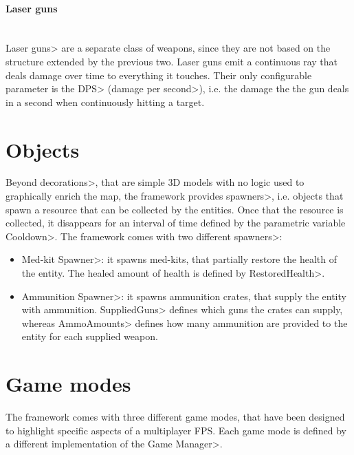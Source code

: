 \paragraph{Laser guns}

\mbox{}\\

{\setlength{\parindent}{0cm}
\<Laser guns> are a separate class of weapons, since they are not based on the structure extended by the previous two. Laser guns emit a continuous ray that deals damage over time to everything it touches. Their only configurable parameter is the \<DPS> (\<damage per second>), i.e. the damage the the gun deals in a second when continuously hitting a target.
}


\section{Objects}

Beyond \<decorations>, that are simple 3D models with no logic used to graphically enrich the map, the framework provides \<spawners>, i.e. objects that spawn a resource that can be collected by the entities. Once that the resource is collected, it disappears for an interval  of time defined by the parametric variable  \<Cooldown>. The framework comes with two different \<spawners>:

\begin{itemize}
\item \<Med-kit Spawner>: it spawns med-kits, that partially restore the health of the entity. The healed amount of health is defined by \<RestoredHealth>.
\item \<Ammunition Spawner>: it spawns ammunition crates, that supply the entity with ammunition. \<SuppliedGuns> defines which guns the crates can supply, whereas \<AmmoAmounts> defines how many ammunition are provided to the entity for each supplied weapon.

\end{itemize}


\section{Game modes}

The framework comes with three different game modes, that have been designed to highlight specific aspects of a multiplayer FPS. Each game mode is defined by a different implementation of the \<Game Manager>.

